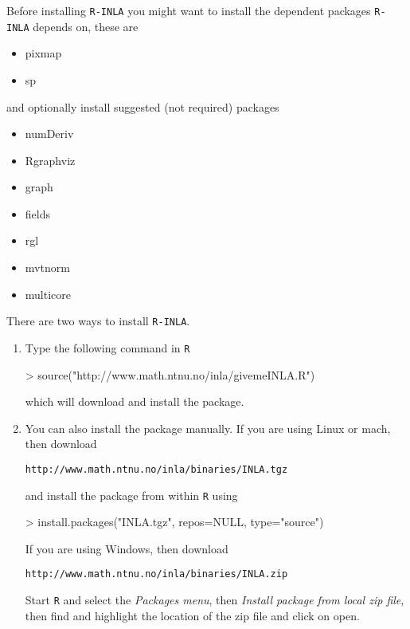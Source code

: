 \documentclass[a4paper,11pt]{report}
\newcommand{\tv}{\texttt}
\begin{document}
Before installing \tv{R-INLA} you might want to install the dependent
packages \tv{R-INLA} depends on, these are
\begin{itemize}
\item pixmap
\item sp
\end{itemize}
and optionally install suggested (not required) packages 
\begin{itemize}
\item numDeriv
\item Rgraphviz
\item graph
\item fields
\item rgl
\item mvtnorm
\item multicore
\end{itemize}
There are two ways to install \tv{R-INLA}.
\begin{enumerate}
\item Type the following command in \tv{R}
\begin{Schunk}
\begin{Sinput}
> source("http://www.math.ntnu.no/inla/givemeINLA.R")
\end{Sinput}
\end{Schunk}
which will download and install the package. 
\item You can also install the package manually. If you are using
    Linux or mach, then 
 download
\begin{verbatim}
http://www.math.ntnu.no/inla/binaries/INLA.tgz
\end{verbatim}
and install the package from within \tv{R} using
\begin{Schunk}
\begin{Sinput}
> install.packages("INLA.tgz", repos=NULL, type="source")
\end{Sinput}
\end{Schunk}
If you are using Windows, then download
\begin{verbatim}
http://www.math.ntnu.no/inla/binaries/INLA.zip
\end{verbatim}
Start \tv{R} and select the \emph{Packages menu}, then \emph{Install
    package from local zip file}, then find and highlight the location
of the zip file and click on open.
\end{enumerate}
\end{document}
